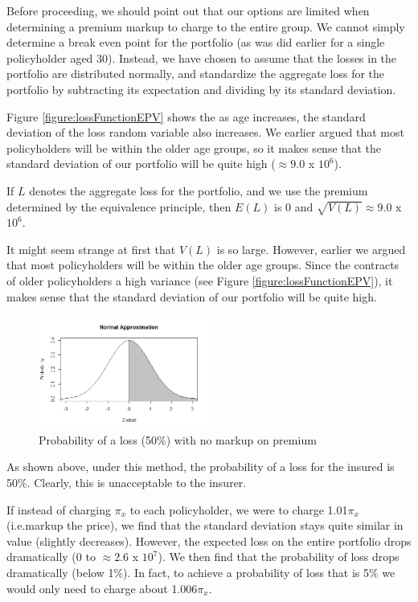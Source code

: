 \documentclass[12pt]{article}
\begin{document}
Before proceeding, we should point out that our options are limited when determining a premium markup to charge to the entire group. We cannot simply determine a break even point for the portfolio (as was did earlier for a single policyholder aged 30). Instead, we have chosen to assume that the losses in the portfolio are distributed normally, and standardize the aggregate loss for the portfolio by subtracting its expectation and dividing by its standard deviation.

Figure \ref{figure:lossFunctionEPV} shows the as age increases, the standard deviation of the loss random variable also increases. We earlier argued that most policyholders will be within the older age groups, so it makes sense that the standard deviation of our portfolio will be quite high ($\approx 9.0$ x $10^{6}$). 

If $L$ denotes the aggregate loss for the portfolio, and we use the premium determined by the equivalence principle, then $E(L)$ is 0 and $\sqrt{V(L)} \approx 9.0$ x $10^{6}$.   

It might seem strange at first that $V(L)$ is so large. However, earlier we argued that most policyholders will be within the older age groups. Since the contracts of older policyholders a high variance (see Figure \ref{figure:lossFunctionEPV}), it makes sense that the standard deviation of our portfolio will be quite high.

\begin{figure}[!ht]
\begin{center}
\includegraphics[width=0.5\textwidth]{images/normalPlot}
\end{center}
\caption{Probability of a loss (50\%) with no markup on premium}
\end{figure}

As shown above, under this method, the probability of a loss for the insured is 50\%. Clearly, this is unacceptable to the insurer.

If instead of charging $\pi_x$ to each policyholder, we were to charge 1.01$\pi_x$ (i.e.markup the price), we find that the standard deviation stays quite similar in value (slightly decreases). However, the expected loss on the entire portfolio drops dramatically (0 to $\approx 2.6$ x $10^{7}$). We then find that the probability of loss drops dramatically (below 1\%). In fact, to achieve a probability of loss that is 5\% we would only need to charge about 1.006$\pi_x$. 
\end{document}
